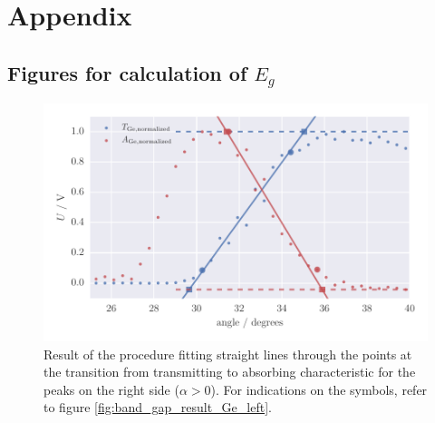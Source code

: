 \section{Appendix}

\subsection{Figures for calculation of $E_g$}
\label{sec:appendix_band_gap_plots}
\begin{figure}[htpb]
    \centering
    \includegraphics[width=1.0\linewidth]{figures/band_gap_result_Ge_right}
    \caption{
        Result of the procedure fitting straight lines through the points 
        at the transition from transmitting to absorbing characteristic
        for the peaks on the right side ($\alpha > 0$). 
        For indications on the symbols, refer to figure 
        \ref{fig:band_gap_result_Ge_left}. 
        }
    \label{fig:band_gap_result_Ge_right}
\end{figure}

